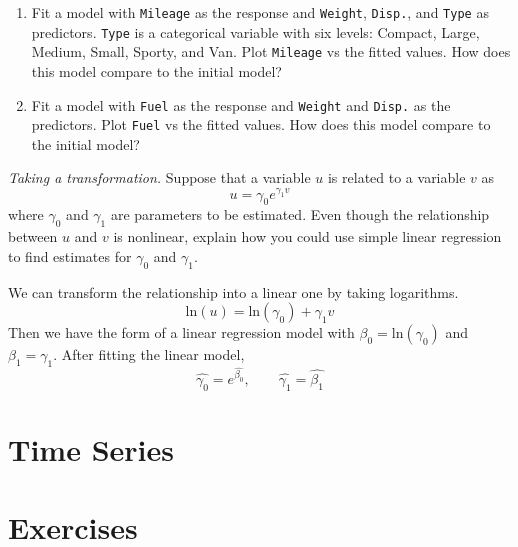 \begin{enumerate}
\item Fit a model with \texttt{Mileage} as the response and
  \texttt{Weight}, \texttt{Disp.}, and \texttt{Type} as predictors.
  \texttt{Type} is a categorical variable with six levels: Compact,
  Large, Medium, Small, Sporty, and Van.
  Plot \texttt{Mileage} vs the fitted values. How does this model
  compare to the initial model?
\item Fit a model with \texttt{Fuel} as the response and
  \texttt{Weight} and \texttt{Disp.} as the predictors.  Plot
  \texttt{Fuel} vs the fitted values.  How does this model compare
  to the initial model?
\end{enumerate}

\emph{Taking a transformation.}
  Suppose that a variable $u$ is related to a variable $v$ as
\[
u = \gamma_0e^{\gamma_1v}
\]
where $\gamma_0$ and $\gamma_1$ are parameters to be estimated.  Even
though the relationship between $u$ and $v$ is nonlinear, explain how
you could use simple linear regression to find estimates for
$\gamma_0$ and $\gamma_1$.

\begin{solution}
\bs
We can transform the relationship into a linear one
by taking logarithms.
\[
\text{ln}(u) = \text{ln}(\gamma_0) + \gamma_1v
\]
Then we have the form of a linear regression model with $\beta_0 = \text{ln}(\gamma_0)$
and $\beta_1 = \gamma_1$. After fitting the linear model,
\[
\hat{\gamma_0}=e^{\hat{\beta_0}}, \qquad \hat{\gamma_1} = \hat{\beta_1}
\]

\end{solution}

\section{Time Series}

\section{Exercises}

